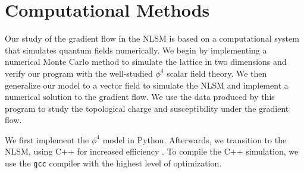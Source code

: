 \documentclass[a4paper,11pt]{article}
\begin{document}
\section{Computational Methods}
Our study of the gradient flow in the NLSM is based on a computational system that simulates quantum fields numerically. We begin by implementing a numerical Monte Carlo method to simulate the lattice in two dimensions and verify our program with the well-studied $\phi^4$ scalar field theory. We then generalize our model to a vector field to simulate the NLSM and implement a numerical solution to the gradient flow. We use the data produced by this program to study the topological charge and susceptibility under the gradient flow.

We first implement the $\phi^4$ model in Python. Afterwards, we transition to the NLSM, using C++ for increased efficiency . To compile the C++ simulation, we use the \texttt{gcc} compiler with the highest level of optimization.
\end{document}
